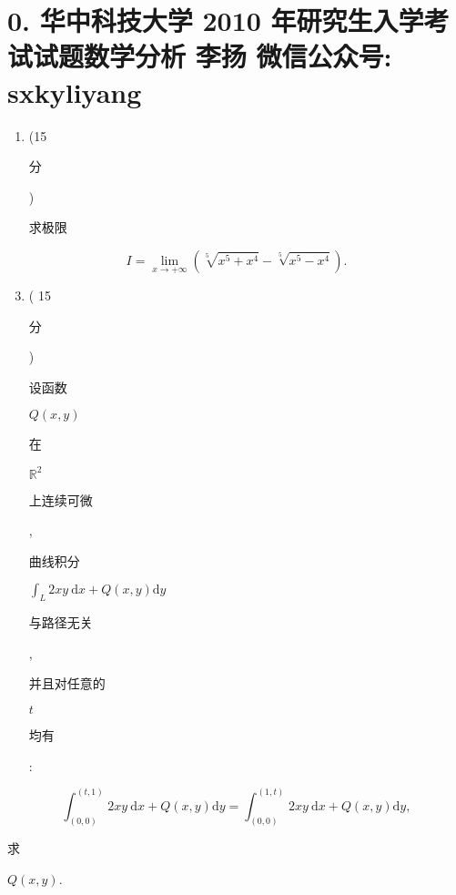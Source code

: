 \documentclass[10pt]{article}
\begin{document}
\section{0. 华中科技大学 2010 年研究生入学考试试题数学分析 
 李扬 
 微信公众号: sxkyliyang}
\begin{enumerate}
  \item (15 \begin{CJK}{UTF8}{mj}分\end{CJK}) \begin{CJK}{UTF8}{mj}求极限\end{CJK}
\end{enumerate}
$$
I=\lim _{x \rightarrow+\infty}\left(\sqrt[5]{x^{5}+x^{4}}-\sqrt[5]{x^{5}-x^{4}}\right) .
$$

\begin{enumerate}
  \setcounter{enumi}{2}
  \item ( 15 \begin{CJK}{UTF8}{mj}分\end{CJK}) \begin{CJK}{UTF8}{mj}设函数\end{CJK} $Q(x, y)$ \begin{CJK}{UTF8}{mj}在\end{CJK} $\mathbb{R}^{2}$ \begin{CJK}{UTF8}{mj}上连续可微\end{CJK}, \begin{CJK}{UTF8}{mj}曲线积分\end{CJK} $\int_{L} 2 x y \mathrm{~d} x+Q(x, y) \mathrm{d} y$ \begin{CJK}{UTF8}{mj}与路径无关\end{CJK}, \begin{CJK}{UTF8}{mj}并且对任意的\end{CJK} $t$ \begin{CJK}{UTF8}{mj}均有\end{CJK}:
\end{enumerate}
$$
\int_{(0,0)}^{(t, 1)} 2 x y \mathrm{~d} x+Q(x, y) \mathrm{d} y=\int_{(0,0)}^{(1, t)} 2 x y \mathrm{~d} x+Q(x, y) \mathrm{d} y,
$$
\begin{CJK}{UTF8}{mj}求\end{CJK} $Q(x, y)$.
\end{document}
